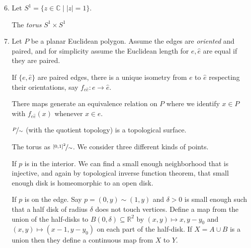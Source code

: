 \begin{enumerate}
    \setcounter{enumi}{5}
    \item Let \(S^1 = \{z \in \mathbb{C}\mid \left\vert z \right\vert =1\}\).
    
    The \textit{torus} \(S^1 \times S^1\)
    \item Let \(P\) be a planar Euclidean polygon. Assume the edges are \textit{oriented} and paired, and for simplicity assume the Euclidean length for \(e, \hat{e}\) are equal if they are paired.

    If \(\{e, \hat{e}\}\) are paired edges, there is a unique isometry from \(e\) to \(\hat{e} \) respecting their orientations, say \(f_{e\hat{e}}: e \to \hat{e} \).

    There maps generate an equivalence relation on \(P\) where we identify \(x \in P\) with \(f_{e \hat{e} }(x)\) whenever \(x \in e\).
    \begin{lemma}
        \(\nicefrac{P}{\sim}\) (with the quotient topology) is a topological surface.
    \end{lemma}
    \begin{example}
        The torus as \(\nicefrac{[0,1]^2}{\sim}\). We consider three different kinds of points.

        If \(p\) is in the interior. We can find a small enough neighborhood that is injective, and again by topological inverse function theorem, that small enough disk is homeomorphic to an open disk.

        If \(p\) is on the edge. Say \(p = (0,y) \sim (1,y)\) and \(\delta >0\) is small enough such that a half disk of radius \(\delta\) does not touch vertices. Define a map from the union of the half-disks to \(B(0,\delta) \subseteq \mathbb{R}^2\) by \((x,y) \mapsto x, y - y_0\) and \((x,y)\mapsto (x-1,y-y_0)\) on each part of the half-disk. If \(X = A \cup B\) is a union then they define a continuous map from \(X\) to \(Y\).
    \end{example}
\end{enumerate}